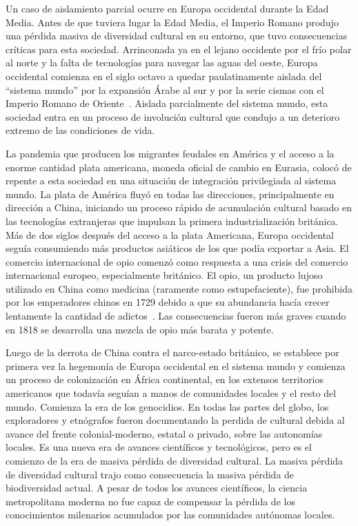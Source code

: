 \documentclass[a4paper,10pt]{book}
\theoremstyle{definition}
\begin{document}

Un caso de aislamiento parcial ocurre en Europa occidental durante la Edad Media.
%
Antes de que tuviera lugar la Edad Media, el Imperio Romano produjo una p\'erdida masiva de diversidad cultural en su entorno, que tuvo consecuencias cr\'iticas para esta sociedad.
%
Arrinconada ya en el lejano occidente por el fr\'io polar al norte y la falta de tecnolog\'ias para navegar las aguas del oeste, Europa occidental comienza en el siglo octavo a quedar paulatinamente aislada del ``sistema mundo'' por la expansi\'on Árabe al sur y por la serie cismas con el Imperio Romano de Oriente~\cite{Dussel}.
%
Aislada parcialmente del sistema mundo, esta sociedad entra en un proceso de involuci\'on cultural que condujo a un deterioro extremo de las condiciones de vida.


La pandemia que producen los migrantes feudales en América y el acceso a la enorme cantidad plata americana, moneda oficial de cambio en Eurasia, coloc\'o de repente a esta sociedad en una situaci\'on de integraci\'on privilegiada al sistema mundo. 
%
La plata de Am\'erica fluy\'o en todas las direcciones, principalmente en direcci\'on a China, iniciando un proceso r\'apido de acumulaci\'on cultural basado en las tecnolog\'ias extranjeras que impulsan la primera industrializaci\'on brit\'anica.
%
Más de dos siglos después del acceso a la plata Americana, Europa occidental segu\'ia consumiendo más productos asi\'aticos de los que pod\'ia exportar a Asia.
%
El comercio internacional de opio comenz\'o como respuesta a una crisis del comercio internacional europeo, especialmente brit\'anico.
%
El opio, un producto lujoso utilizado en China como medicina (raramente como estupefaciente), fue prohibida por los emperadores chinos en 1729 debido a que su abundancia hac\'ia crecer lentamente la cantidad de adictos~\cite{Kennet}.
%
Las consecuencias fueron m\'as graves cuando en 1818 se desarrolla una mezcla de opio m\'as barata y potente.


Luego de la derrota de China contra el narco-estado brit\'anico, se establece por primera vez la hegemon\'ia de Europa occidental en el sistema mundo y comienza un proceso de colonizaci\'on en África continental, en los extensos territorios americanos que todav\'ia segu\'ian a manos de comunidades locales y el resto del mundo.
%
Comienza la era de los genocidios.
%
En todas las partes del globo, los exploradores y etn\'ografos fueron documentando la perdida de cultural debida al avance del frente colonial-moderno, estatal o privado, sobre las autonom\'ias locales.
%
Es una nueva era de avances cient\'ificos y tecnol\'ogicos, pero es el comienzo de la era de masiva p\'erdida de diversidad cultural.
%
La masiva p\'erdida de diversidad cultural trajo como consecuencia la masiva p\'erdida de biodiversidad actual.
%
A pesar de todos los avances cient\'ificos, la ciencia metropolitana moderna no fue capaz de compensar la p\'erdida de los conocimientos milenarios acumulados por las comunidades aut\'onomas locales.
\end{document}
